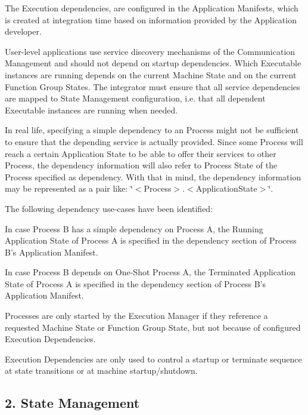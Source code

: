 \begin{DoxyItemize}
\begin{DoxyItemize}
\item The Execution dependencies, are configured in the Application Manifests, which is created at integration time based on information provided by the Application developer.
\item User-\/level applications use service discovery mechanisms of the Communication Management and should not depend on startup dependencies. Which Executable instances are running depends on the current Machine State and on the current Function Group States. The integrator must ensure that all service dependencies are mapped to State Management configuration, i.\+e. that all dependent Executable instances are running when needed.
\item In real life, specifying a simple dependency to an Process might not be sufficient to ensure that the depending service is actually provided. Since some Process will reach a certain Application State to be able to offer their services to other Process, the dependency information will also refer to Process State of the Process specified as dependency. With that in mind, the dependency information may be represented as a pair like\+: \char`\"{}$<$\+Process$>$.$<$\+Application\+State$>$\char`\"{}.
\item The following dependency use-\/cases have been identified\+:
\begin{DoxyItemize}
\item In case Process B has a simple dependency on Process A, the Running Application State of Process A is specified in the dependency section of Process B’s Application Manifest.
\item In case Process B depends on One-\/\+Shot Process A, the Terminated Application State of Process A is specified in the dependency section of Process B’s Application Manifest.
\end{DoxyItemize}
\item Processes are only started by the Execution Manager if they reference a requested Machine State or Function Group State, but not because of configured Execution Dependencies.
\item Execution Dependencies are only used to control a startup or terminate sequence at state transitions or at machine startup/shutdown.
\end{DoxyItemize}
\end{DoxyItemize}

\subsection*{2. {\bfseries State Management}}



